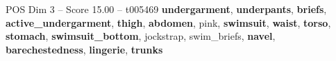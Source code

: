 \begin{textsample}{POS Dim 3 – Score 15.00 – t005469}  \label{ex:f3_pos_031}
\textbf{undergarment}, \textbf{underpants}, \textbf{briefs}, \textbf{active\_undergarment}, \textbf{thigh}, \textbf{abdomen}, pink, \textbf{swimsuit}, \textbf{waist}, \textbf{torso}, \textbf{stomach}, \textbf{swimsuit\_bottom}, jockstrap, swim\_briefs, \textbf{navel}, \textbf{barechestedness}, \textbf{lingerie}, \textbf{trunks}

\end{textsample}
